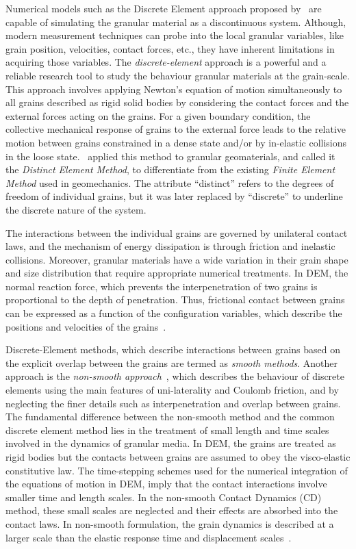 Numerical models such as the Discrete Element approach proposed 
by~\citet{Cundall1979a} are capable of simulating the granular material as a 
discontinuous system. Although, modern measurement techniques can probe into 
the local granular variables, like grain position, velocities, contact 
forces, etc., they have inherent limitations in acquiring those variables. The 
\textit{discrete-element} approach is a powerful and a reliable research tool 
to study the behaviour granular materials at the grain-scale. This approach 
involves applying Newton's equation of motion simultaneously to all grains 
described as rigid solid bodies by considering the contact forces and the 
external forces acting on the grains. For a given boundary condition, the 
collective mechanical response of grains to the external force leads to the 
relative motion between grains constrained in a dense state and/or by 
in-elastic collisions in the loose state.~\citet{Cundall1979a} applied this 
method to granular geomaterials, and called it the \textit{Distinct Element 
Method}, to differentiate from the existing \textit{Finite Element Method} used 
in geomechanics. The attribute ``distinct'' refers to the degrees of freedom of 
individual grains, but it was later replaced by ``discrete'' to underline 
the discrete nature of the system. 

The interactions between the individual grains are governed by unilateral 
contact laws, and the mechanism of energy dissipation is through friction and 
inelastic collisions. Moreover, granular materials have a wide variation in 
their grain shape and size distribution that require appropriate numerical 
treatments. In DEM, the normal reaction force, 
which prevents the interpenetration of two grains is proportional to the depth 
of penetration. Thus, frictional contact between grains can be expressed 
as a function of the configuration variables, which describe the positions and 
velocities of the grains~\citep{Radjai2011}.

Discrete-Element methods, which describe interactions between grains based on 
the explicit overlap between the grains are termed as \textit{smooth methods}. 
Another approach is the \textit{non-smooth approach}~\citep{Jean1999}, which 
describes the behaviour of discrete elements using the main features of 
uni-laterality and Coulomb friction, and by neglecting the finer details such 
as interpenetration and overlap between grains. The fundamental difference 
between the non-smooth method and the common discrete element method 
lies in the treatment of small length and time scales involved 
in the dynamics of granular media. In DEM, the grains are treated 
as rigid bodies but the contacts between grains are assumed to obey the 
visco-elastic constitutive law. The time-stepping schemes used for the 
numerical integration of the equations of motion in DEM, 
imply that the contact interactions involve smaller time and length scales. In 
the non-smooth Contact Dynamics (CD) method, these small scales are neglected 
and their effects are absorbed into the contact laws. In non-smooth 
formulation, the grain dynamics is described at a larger scale than the elastic 
response time and displacement scales~\citep{Jean1999, Radjai2009}. 

